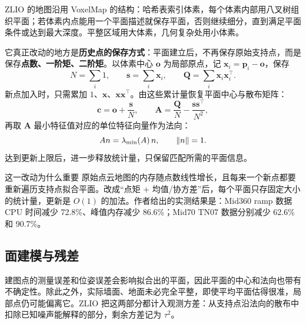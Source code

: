ZLIO 的地图沿用 VoxelMap\cite{yuan2022voxelmap} 的结构：哈希表索引体素，每个体素内部用八叉树组织平面；若体素内点能用一个平面描述就保存平面，否则继续细分，直到满足平面条件或达到最大深度。平整区域用大体素，几何复杂处用小体素。

它真正改动的地方是\textbf{历史点的保存方式}：平面建立后，不再保存原始支持点，而是保存\textbf{点数、一阶矩、二阶矩}。以体素中心 $\bm{o}$ 为局部原点，记 $\bm{x}_i=\bm{p}_i-\bm{o}$，保存
\begin{equation}
N=\sum_i 1,\qquad \bm{s}=\sum_i \bm{x}_i,\qquad \bm{Q}=\sum_i \bm{x}_i\bm{x}_i^{\top}.
\label{eq:23-moments}
\end{equation}
新点加入时，只需累加 $1$、$\bm{x}$、$\bm{x}\bm{x}^{\top}$。由这些累计量恢复平面中心与散布矩阵：
\begin{equation}
\bm{c}=\bm{o}+\frac{\bm{s}}{N},\qquad
\bm{A}=\frac{\bm{Q}}{N}-\frac{\bm{s}\bm{s}^{\top}}{N^{2}},
\label{eq:23-plane}
\end{equation}
再取 $\bm{A}$ 最小特征值对应的单位特征向量作为法向：
\begin{equation}
An=\lambda_{\min}(A)\,n,\qquad \left\lVert n \right\rVert=1.
\label{eq:23-normal}
\end{equation}
达到更新上限后，进一步释放统计量，只保留匹配所需的平面信息。

\begin{keybox}{这一改动为什么重要}
原始点云地图的内存随点数线性增长，且每来一个新点都要重新遍历支持点拟合平面。改成“点矩 + 均值/协方差”后，每个平面只存固定大小的统计量，更新是 $O(1)$ 的加法。作者给出的实测结果是：Mid360 ramp 数据 CPU 时间减少 72.8\%、峰值内存减少 86.6\%；Mid70 TN07 数据分别减少 62.6\% 和 90.7\%。
\end{keybox}

\subsection{面建模与残差}

建图点的测量误差和位姿误差会影响拟合出的平面，因此平面的中心和法向也带有不确定性。除此之外，实际墙面、地面未必完全平整，即使平均平面估得很准，局部点仍可能偏离它。ZLIO 把这两部分都计入观测方差：从支持点沿法向的散布中扣除已知噪声能解释的部分，剩余方差记为 $\tau^{2}$。

